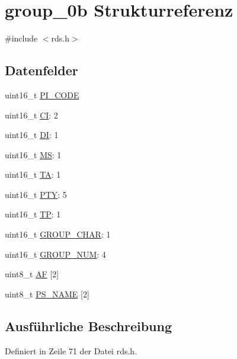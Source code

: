 \hypertarget{structgroup__0b}{}\section{group\+\_\+0b Strukturreferenz}
\label{structgroup__0b}


{\ttfamily \#include $<$rds.\+h$>$}

\subsection*{Datenfelder}
\begin{DoxyCompactItemize}
\item 
uint16\+\_\+t \hyperlink{structgroup__0b_a5cd9b1f6413028425796c1129aa8fd87}{P\+I\+\_\+\+C\+O\+D\+E}
\item 
uint16\+\_\+t \hyperlink{structgroup__0b_aa6fd8556e02ce89fed23057f1cb37e44}{C\+I}\+: 2
\item 
uint16\+\_\+t \hyperlink{structgroup__0b_ad020d0abff338c9c34924a44478ac591}{D\+I}\+: 1
\item 
uint16\+\_\+t \hyperlink{structgroup__0b_a0d87191040df43fdd9f67487d0cc1a45}{M\+S}\+: 1
\item 
uint16\+\_\+t \hyperlink{structgroup__0b_a6de7751205cef4ffcce610399a030892}{T\+A}\+: 1
\item 
uint16\+\_\+t \hyperlink{structgroup__0b_a0474967478fbbc2c71b800d2e0132d45}{P\+T\+Y}\+: 5
\item 
uint16\+\_\+t \hyperlink{structgroup__0b_ab9e634c63b0d95a96716d5f6d7f06d72}{T\+P}\+: 1
\item 
uint16\+\_\+t \hyperlink{structgroup__0b_a66d4119990dc4c3e040a43885e9bb953}{G\+R\+O\+U\+P\+\_\+\+C\+H\+A\+R}\+: 1
\item 
uint16\+\_\+t \hyperlink{structgroup__0b_a9f692e9f76ee88348d426bcd4e9bc70b}{G\+R\+O\+U\+P\+\_\+\+N\+U\+M}\+: 4
\item 
uint8\+\_\+t \hyperlink{structgroup__0b_ae5a8515ae995b21e542b2ad52b20c34e}{A\+F} \mbox{[}2\mbox{]}
\item 
uint8\+\_\+t \hyperlink{structgroup__0b_a80447425671c19133df16d620705bb09}{P\+S\+\_\+\+N\+A\+M\+E} \mbox{[}2\mbox{]}
\end{DoxyCompactItemize}


\subsection{Ausführliche Beschreibung}


Definiert in Zeile 71 der Datei rds.\+h.



